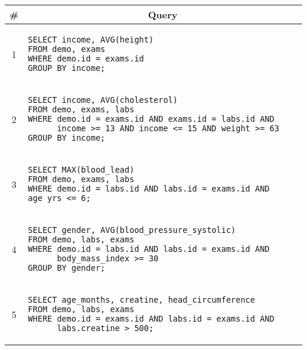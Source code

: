 \begin{tabular}{cl}
\toprule
\# & \multicolumn{1}{c}{Query} \\
\midrule
1 & 
\begin{minipage}{6in}
\begin{lstlisting}[breaklines]
SELECT income, AVG(height)
FROM demo, exams
WHERE demo.id = exams.id
GROUP BY income;
\end{lstlisting}
\end{minipage}{queryno} \label{q1} \\
2 & 
\begin{minipage}{6in}
\begin{lstlisting}[breaklines]
SELECT income, AVG(cholesterol)
FROM demo, exams, labs
WHERE demo.id = exams.id AND exams.id = labs.id AND
      income >= 13 AND income <= 15 AND weight >= 63
GROUP BY income;
\end{lstlisting}
\end{minipage}
{queryno} \label{q2} \\
3 & 
\begin{minipage}{6in}
\begin{lstlisting}[breaklines]
SELECT MAX(blood_lead)
FROM demo, exams, labs
WHERE demo.id = labs.id AND labs.id = exams.id AND age_yrs <= 6;
\end{lstlisting}
\end{minipage}{queryno} \label{q3}\\
4 & 
\begin{minipage}{6in}
\begin{lstlisting}[breaklines]
SELECT gender, AVG(blood_pressure_systolic)
FROM demo, labs, exams
WHERE demo.id = labs.id AND labs.id = exams.id AND
      body_mass_index >= 30
GROUP BY gender;
\end{lstlisting}
\end{minipage}{queryno} \label{q4}\\
5 & 
\begin{minipage}{6in}
\begin{lstlisting}[breaklines]
SELECT age_months, creatine, head_circumference
FROM demo, labs, exams
WHERE demo.id = exams.id AND labs.id = exams.id AND
      labs.creatine > 500;
\end{lstlisting}
\end{minipage}{queryno} \label{q5}\\
\bottomrule
\end{tabular}
